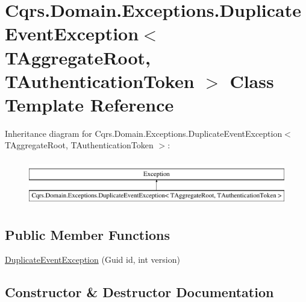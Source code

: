 \hypertarget{classCqrs_1_1Domain_1_1Exceptions_1_1DuplicateEventException}{}\section{Cqrs.\+Domain.\+Exceptions.\+Duplicate\+Event\+Exception$<$ T\+Aggregate\+Root, T\+Authentication\+Token $>$ Class Template Reference}
\label{classCqrs_1_1Domain_1_1Exceptions_1_1DuplicateEventException}
Inheritance diagram for Cqrs.\+Domain.\+Exceptions.\+Duplicate\+Event\+Exception$<$ T\+Aggregate\+Root, T\+Authentication\+Token $>$\+:\begin{figure}[H]
\begin{center}
\leavevmode
\includegraphics[height=2.000000cm]{classCqrs_1_1Domain_1_1Exceptions_1_1DuplicateEventException}
\end{center}
\end{figure}
\subsection*{Public Member Functions}
\begin{DoxyCompactItemize}
\item 
\hyperlink{classCqrs_1_1Domain_1_1Exceptions_1_1DuplicateEventException_a33eb0ada16fe2395ea921f571e45c415}{Duplicate\+Event\+Exception} (Guid id, int version)
\end{DoxyCompactItemize}


\subsection{Constructor \& Destructor Documentation}
\mbox{\label{classCqrs_1_1Domain_1_1Exceptions_1_1DuplicateEventException_a33eb0ada16fe2395ea921f571e45c415}} 
